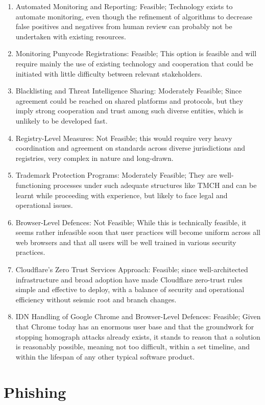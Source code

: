  \begin{enumerate}
  \item Automated Monitoring and Reporting: Feasible; Technology exists to automate monitoring, even though the refinement of algorithms to decrease false positives and negatives from human review can probably not be undertaken with existing resources.
  \item  Monitoring Punycode Registrations: Feasible; This option is feasible and will require mainly the use of existing technology and cooperation that could be initiated with little difficulty between relevant stakeholders.
  \item Blacklisting and Threat Intelligence Sharing: Moderately Feasible; Since agreement could be reached on shared platforms and protocols, but they imply strong cooperation and trust among such diverse entities, which is unlikely to be developed fast.
  \item Registry-Level Measures: Not Feasible; this would require very heavy coordination and agreement on standards across diverse jurisdictions and registries, very complex in nature and long-drawn.
  \item Trademark Protection Programs: Moderately Feasible; They are well-functioning processes under such adequate structures like TMCH and can be learnt while proceeding with experience, but likely to face legal and operational issues.
  \item  Browser-Level Defences: Not Feasible; While this is technically feasible, it seems rather infeasible soon that user practices will become uniform across all web browsers and that all users will be well trained in various security practices.
  \item Cloudflare's Zero Trust Services Approach: Feasible; since well-architected infrastructure and broad adoption have made Cloudflare zero-trust rules simple and effective to deploy, with a balance of security and operational efficiency without seismic root and branch changes.
  \item IDN Handling of Google Chrome and Browser-Level Defences: Feasible; Given that Chrome today has an enormous user base and that the groundwork for stopping homograph attacks already exists, it stands to reason that a solution is reasonably possible, meaning not too difficult, within a set timeline, and within the lifespan of any other typical software product.

  
\end{enumerate}

\section{Phishing}

